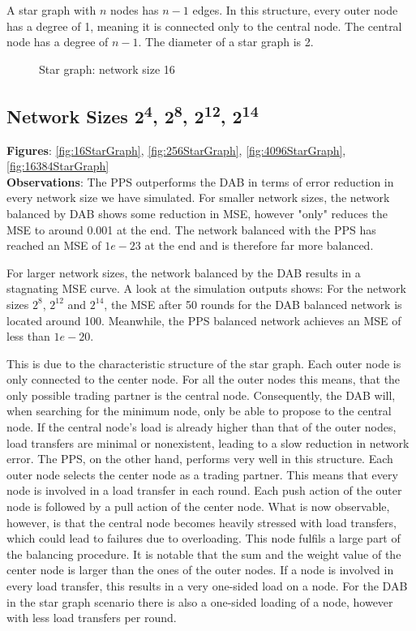 A star graph with $n$ nodes has $n-1$ edges. In this structure, every outer node has a degree of 1, meaning it is connected only to the central node. The central node has a degree of $n-1$. The diameter of a star graph is 2.
\begin{figure}[H]
    \centering
    
    \caption{Star graph: network size 16}
    \label{fig:stargraphDemo}
\end{figure}
\subsection{Network Sizes 2\textsuperscript{4}, 2\textsuperscript{8}, 2\textsuperscript{12}, 2\textsuperscript{14}}
\textbf{Figures}: \ref{fig:16StarGraph}, \ref{fig:256StarGraph}, \ref{fig:4096StarGraph}, \ref{fig:16384StarGraph}\\
\textbf{Observations}: The PPS outperforms the DAB in terms of error reduction in every network size we have simulated. For smaller network sizes, the network balanced by DAB shows some reduction in MSE, however "only" reduces the MSE to around 0.001 at the end. The network balanced with the PPS has reached an MSE of $1e-23$ at the end and is therefore far more balanced.

For larger network sizes, the network balanced by the DAB results in a stagnating MSE curve. A look at the simulation outputs shows: For the network sizes $2^{8}$, $2^{12}$ and $2^{14}$, the MSE after 50 rounds for the DAB balanced network is located around 100. Meanwhile, the PPS balanced network achieves an MSE of less than $1e-20$.

This is due to the characteristic structure of the star graph. Each outer node is only connected to the center node. For all the outer nodes this means, that the only possible trading partner is the central node. Consequently, the DAB will, when searching for the minimum node, only be able to propose to the central node. If the central node's load is already higher than that of the outer nodes, load transfers are minimal or nonexistent, leading to a slow reduction in network error. The PPS, on the other hand, performs very well in this structure. Each outer node selects the center node as a trading partner. This means that every node is involved in a load transfer in each round. Each push action of the outer node is followed by a pull action of the center node. What is now observable, however, is that the central node becomes heavily stressed with load transfers, which could lead to failures due to overloading. This node fulfils a large part of the balancing procedure. It is notable that the sum and the weight value of the center node is larger than the ones of the outer nodes. If a node is involved in every load transfer, this results in a very one-sided load on a node. For the DAB in the star graph scenario there is also a one-sided loading of a node, however with less load transfers per round.

